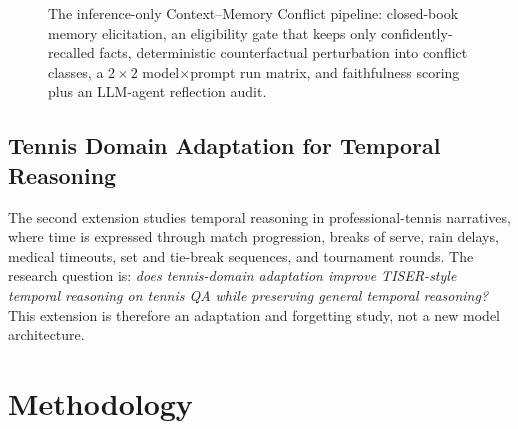 \documentclass[conference]{IEEEtran}
\begin{document}
\begin{figure}[t]
\centering
{}
\caption{The inference-only Context--Memory Conflict pipeline: closed-book memory elicitation, an eligibility gate that keeps only confidently-recalled facts, deterministic counterfactual perturbation into conflict classes, a $2{\times}2$ model$\times$prompt run matrix, and faithfulness scoring plus an LLM-agent reflection audit.}
\label{fig:pipeline}
\end{figure}

\subsection{Tennis Domain Adaptation for Temporal Reasoning}

The second extension studies temporal reasoning in professional-tennis narratives, where time is expressed through match progression, breaks of serve, rain delays, medical timeouts, set and tie-break sequences, and tournament rounds. The research question is: \emph{does tennis-domain adaptation improve TISER-style temporal reasoning on tennis QA while preserving general temporal reasoning?} This extension is therefore an adaptation and forgetting study, not a new model architecture.

\section{Methodology}
\label{sec:methodology}
\end{document}

